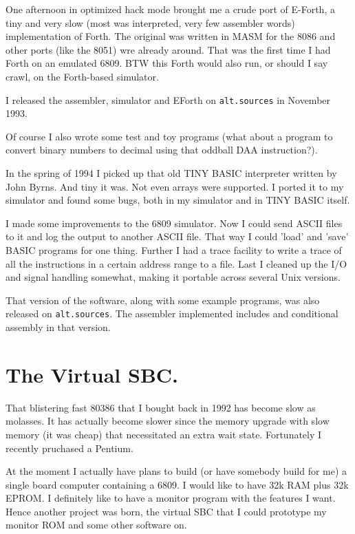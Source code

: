 One afternoon in optimized hack mode brought me a crude port of E-Forth, a
tiny and very slow (most was interpreted, very few assembler words)
implementation of Forth. The original was written in MASM for the 8086  and
other ports (like the 8051) wre already around. That was the first time I
had Forth on an emulated 6809. BTW this Forth would also run, or should I
say crawl, on the Forth-based simulator. 

I released the assembler, simulator and EForth on {\tt alt.sources} in November
1993.

Of course I also wrote some test and toy programs (what about a program to
convert binary numbers to decimal using that oddball DAA instruction?). 

In the spring of 1994 I picked up that old TINY BASIC interpreter written by
John Byrns. And tiny it was. Not even arrays were supported. I ported it to
my simulator and found some bugs, both in my simulator and in TINY BASIC
itself. 

I made some improvements to the 6809 simulator. Now I could send ASCII files
to it and log the output to another ASCII file. That way I could 'load' and
'save' BASIC programs for one thing. Further I had a trace facility to write
a trace of all the instructions in a certain address range to a file. Last I
cleaned up the I/O and signal handling somewhat, making it portable across
several Unix versions.

That version of the software, along with some example programs, was also
released on {\tt alt.sources}. The assembler implemented includes and conditional
assembly in that version.

\section{The Virtual SBC.}

That blistering fast 80386 that I bought back in 1992 has become slow as
molasses. It has actually become slower since the memory upgrade with
slow memory (it was cheap) that necessitated an extra wait state. 
Fortunately I recently pruchased a Pentium.

At the moment I actually have plans to build (or have somebody build for me)
a single board computer containing a 6809. I would like to have 32k RAM plus
32k EPROM. I definitely like to have a monitor program with the features I
want. Hence another project was born, the virtual SBC that I could prototype
my monitor ROM and some other software on.

